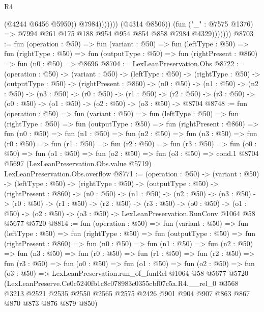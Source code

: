 \begin{lexlean}{R4}
\begin{coremodule}
                                  (@4244 @6456 @5950))
                                @7984)))))))
                  (@4314 @8506))
                (fun ("_" : @7575 @1376) =>
                @7994 @261 @175 @188 @954 @954 @854 @858 @7984 @4329)))))))
@8703 := fun (operation : @50) =>
  fun (variant : @50) =>
  fun (leftType : @50) =>
  fun (rightType : @50) =>
  fun (outputType : @50) => fun (rightPresent : @860) => fun (n0 : @50) => @8696
@8704 := LexLeanPreservation.Obs
@8722 := (operation : @50) ->
  (variant : @50) ->
  (leftType : @50) ->
  (rightType : @50) ->
  (outputType : @50) ->
  (rightPresent : @860) ->
  (n0 : @50) ->
  (n1 : @50) ->
  (n2 : @50) ->
  (n3 : @50) ->
  (r0 : @50) ->
  (r1 : @50) ->
  (r2 : @50) -> (r3 : @50) -> (o0 : @50) -> (o1 : @50) -> (o2 : @50) -> (o3 : @50) -> @8704
@8748 := fun (operation : @50) =>
  fun (variant : @50) =>
  fun (leftType : @50) =>
  fun (rightType : @50) =>
  fun (outputType : @50) =>
  fun (rightPresent : @860) =>
  fun (n0 : @50) =>
  fun (n1 : @50) =>
  fun (n2 : @50) =>
  fun (n3 : @50) =>
  fun (r0 : @50) =>
  fun (r1 : @50) =>
  fun (r2 : @50) =>
  fun (r3 : @50) =>
  fun (o0 : @50) =>
  fun (o1 : @50) =>
  fun (o2 : @50) =>
  fun (o3 : @50) =>
  cond.{1} @8704 @5697 (LexLeanPreservation.Obs.value @5719) LexLeanPreservation.Obs.overflow
@8771 := (operation : @50) ->
  (variant : @50) ->
  (leftType : @50) ->
  (rightType : @50) ->
  (outputType : @50) ->
  (rightPresent : @860) ->
  (n0 : @50) ->
  (n1 : @50) ->
  (n2 : @50) ->
  (n3 : @50) ->
  (r0 : @50) ->
  (r1 : @50) ->
  (r2 : @50) ->
  (r3 : @50) ->
  (o0 : @50) ->
  (o1 : @50) -> (o2 : @50) -> (o3 : @50) -> LexLeanPreservation.RunConv @1064 @58 @5677 @5720
@8814 := fun (operation : @50) =>
  fun (variant : @50) =>
  fun (leftType : @50) =>
  fun (rightType : @50) =>
  fun (outputType : @50) =>
  fun (rightPresent : @860) =>
  fun (n0 : @50) =>
  fun (n1 : @50) =>
  fun (n2 : @50) =>
  fun (n3 : @50) =>
  fun (r0 : @50) =>
  fun (r1 : @50) =>
  fun (r2 : @50) =>
  fun (r3 : @50) =>
  fun (o0 : @50) =>
  fun (o1 : @50) =>
  fun (o2 : @50) =>
  fun (o3 : @50) =>
  LexLeanPreservation.run_of_funRel
    @1064
    @58
    @5677
    @5720
    (LexLeanPreserve.Ce0c5240fb1c8c078983c0355cbf07c5a.R4.__rel_0
      @3568
      @3213
      @2521
      @2535
      @2550
      @2565
      @2575
      @2426
      @901
      @904
      @907
      @863
      @867
      @870
      @873
      @876
      @879
      @850)
\end{coremodule}
\end{lexlean}
